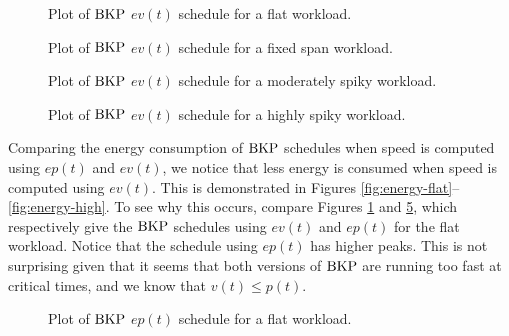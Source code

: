 \documentclass[11pt]{article}
\newcommand{\BKP}{{\rm BKP}}
\begin{document}
\begin{figure}
\centering
{}
\caption{Plot of $\BKP$ $ev(t)$ schedule for a flat workload.}
\label{fig:BKP_vt_Flat}
\end{figure}

\begin{figure}
\centering
{}
\caption{Plot of $\BKP$ $ev(t)$ schedule for a fixed span workload.}
\label{fig:BKP_vt_Fixed}
\end{figure}

\begin{figure}
\centering
{}
\caption{Plot of $\BKP$ $ev(t)$ schedule for a moderately spiky workload.}
\label{fig:BKP_vt_Moderate}
\end{figure}

\begin{figure}
\centering
{}
\caption{Plot of $\BKP$ $ev(t)$ schedule for a highly spiky workload.}
\label{fig:BKP_vt_High}
\end{figure}

Comparing the energy consumption of $\BKP$ schedules when speed is
computed using $ep(t)$ and $ev(t)$, we notice that less energy is
consumed when speed is computed using $ev(t)$.
This is demonstrated in
Figures \ref{fig:energy-flat}--\ref{fig:energy-high}.
To see why this occurs, compare Figures \ref{fig:BKP_vt_Flat} and
\ref{fig:BKP_pt_Flat}, which respectively give the 
$\BKP$ schedules using $ev(t)$ and $ep(t)$ for the flat workload.
Notice that the schedule using $ep(t)$ has higher peaks.
This is not surprising given that it seems that both versions of $\BKP$  are
running too fast at critical times, and we know that $v(t) \le p(t)$.

\begin{figure}
\centering
{}
\caption{Plot of $\BKP$ $ep(t)$ schedule for a flat workload.}
\label{fig:BKP_pt_Flat}
\end{figure}
\end{document}
